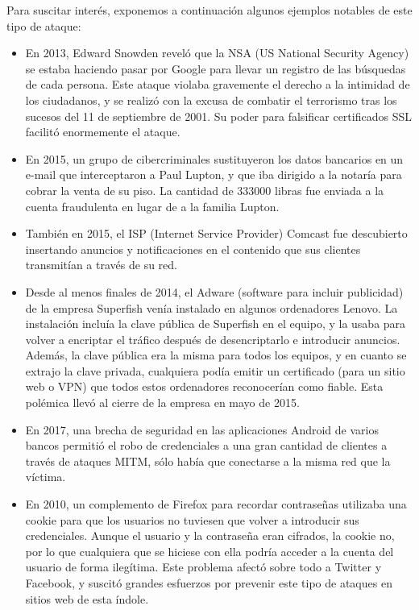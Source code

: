 \documentclass[11pt]{article}
\begin{document}
Para suscitar interés, exponemos a continuación algunos ejemplos notables de este tipo de ataque:
\begin{itemize}
	\item En 2013, Edward Snowden reveló que la NSA (US National Security Agency) se estaba haciendo pasar por Google para llevar un
	registro de las búsquedas de cada persona. Este ataque violaba gravemente el derecho a la intimidad de los ciudadanos, y se realizó con
	la excusa de combatir el terrorismo tras los sucesos del 11 de septiembre de 2001. Su poder para falsificar certificados SSL facilitó
	enormemente el ataque.
	
	\item En 2015, un grupo de cibercriminales sustituyeron los datos bancarios en un e-mail que interceptaron a Paul Lupton, y que iba dirigido
	a la notaría para cobrar la venta de su piso. La cantidad de 333000 libras fue enviada a la cuenta fraudulenta en lugar de a la familia Lupton.
	
	\item También en 2015, el ISP (Internet Service Provider) Comcast fue descubierto insertando anuncios y notificaciones en el contenido
	que sus clientes transmitían a través de su red.
	
	\item Desde al menos finales de 2014, el Adware (software para incluir publicidad) de la empresa Superfish venía instalado en algunos ordenadores
	Lenovo. La instalación incluía la clave pública de Superfish en el equipo, y la usaba para volver a encriptar el tráfico después de desencriptarlo
	e introducir anuncios. Además, la clave pública era la misma para todos los equipos, y en cuanto se extrajo la clave privada, cualquiera podía
	emitir un certificado (para un sitio web o VPN) que todos estos ordenadores reconocerían como fiable. Esta polémica llevó al cierre de la empresa
	en mayo de 2015.
	
	\item En 2017, una brecha de seguridad en las aplicaciones Android de varios bancos permitió el robo de credenciales a una gran cantidad de clientes
	a través de ataques MITM, sólo había que conectarse a la misma red que la víctima.
	
	\item En 2010, un complemento de Firefox para recordar contraseñas utilizaba una cookie para que los usuarios no tuviesen que volver a introducir
	sus credenciales. Aunque el usuario y la contraseña eran cifrados, la cookie no, por lo que cualquiera que se hiciese con ella podría acceder
	a la cuenta del usuario de forma ilegítima. Este problema afectó sobre todo a Twitter y Facebook, y suscitó grandes esfuerzos por prevenir este tipo
	 de ataques en sitios web de esta índole.
\end{itemize}
\end{document}

